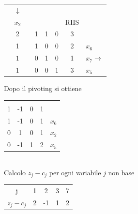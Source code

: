 \begin{table}[!h]
	\centering
	\begin{tabular}{r|c|c|ccc|c|l}
		\multicolumn{1}{c}{} & \multicolumn{1}{c}{$\downarrow$} & \multicolumn{1}{c}{} &  &  & \multicolumn{1}{c}{} & \multicolumn{1}{c}{} & \\
		\multicolumn{1}{c}{} & \multicolumn{1}{c}{$x_{2}$} & \multicolumn{1}{c}{} &  &  & \multicolumn{1}{c}{} & \multicolumn{1}{c}{RHS} & \\ \cline{2-2} \cline{4-7}
		& 2 &  & 1 & 1 & 0 & 3 &  \\ \cline{2-2} \cline{4-7}
		& 1 &  & 1 & 0 & 0 & 2 & $x_{6}$ \\
		& {\LARGE \textcircled{\normalsize $1$}} &  & 0 & 1 & 0 & 1 & $x_{7}\rightarrow$ \\
		& 1 &  & 0 & 0 & 1 & 3 & $x_{5}$ \\
		\cline{2-2} \cline{4-7}
	\end{tabular}
\end{table}
Dopo il pivoting si ottiene
\begin{table}[!h]
	\centering
	\begin{tabular}{|ccc|c|c}
		\multicolumn{1}{c}{} & & \multicolumn{1}{c}{} & \multicolumn{1}{c}{} & \\ \cline{1-4}
		1 & -1 & 0 & 1 & \\ \cline{1-4}
		1 & -1 & 0 & 1 & $x_{6}$ \\
		0 & 1 & 0 & 1 & $x_{2}$ \\
		0 & -1 & 1 & 2 & $x_{5}$ \\ \cline{1-4}
	\end{tabular}
\end{table}
\\Calcolo $z_{j}-c_{j}$ per ogni variabile $j$ non base
\begin{table}[!h]
	\begin{tabular}{c|cccc}
		j & 1 & 2 & 3 & 7 \\ \cline{2-5}
		$z_{j}-c_{j}$ & 2 & -1 & 1 & 2
	\end{tabular}
\end{table}

